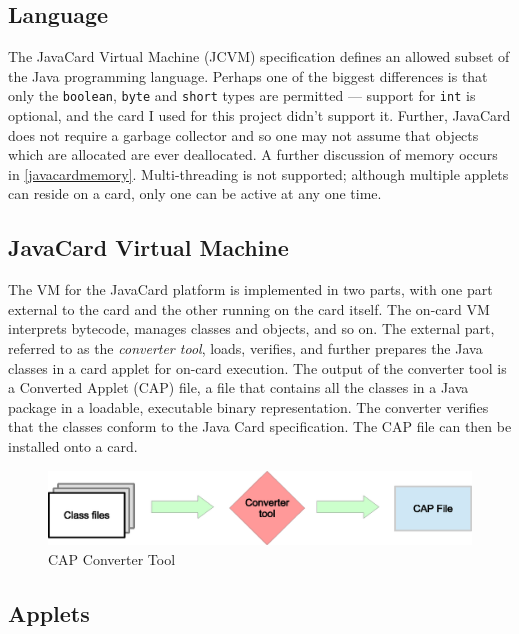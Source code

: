 \documentclass[12pt,a4paper,twoside,openright]{report}
\begin{document}
\subsection{Language}

The JavaCard Virtual Machine (JCVM) specification defines an allowed subset of the Java programming language. Perhaps one of the biggest differences is that only the \texttt{boolean}, \texttt{byte} and \texttt{short} types are permitted --- support for \texttt{int} is optional, and the card I used for this project didn't support it. Further, JavaCard does not require a garbage collector and so one may not assume that objects which are allocated are ever deallocated. A further discussion of memory occurs in \autoref{javacardmemory}. Multi-threading is not supported; although multiple applets can reside on a card, only one can be active at any one time.

\subsection{JavaCard Virtual Machine}

The VM for the JavaCard platform is implemented in two parts, with one part external to the card and the other running on the card itself. The on-card VM interprets bytecode, manages classes and objects, and so on. The external part, referred to as the \emph{converter tool}, loads, verifies, and further prepares the Java classes in a card applet for on-card execution. The output of the converter tool is a Converted Applet (CAP) file, a file that contains all the classes in a Java package in a loadable, executable binary representation. The converter verifies that the classes conform to the Java Card specification. The CAP file can then be installed onto a card.

\begin{figure}[tbh]
\centerline{\includegraphics{figures/capconverter.eps}}
\caption{CAP Converter Tool}
\label{capconverter}
\end{figure}

\subsection{Applets}
\label{sec:applets}
\end{document}
